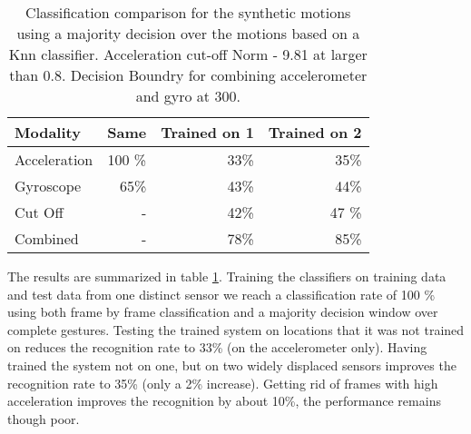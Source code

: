 \begin{table}
\centering 
\caption[Classification comparison]{\label{tab:synthetic1} Classification comparison for the synthetic motions using a
majority decision over the motions based on a Knn classifier. Acceleration cut-off Norm - 9.81 at larger than 0.8. Decision Boundry for combining accelerometer and gyro at 300. }
\begin{tabularx}{\textwidth}{Xrrr}\toprule
Modality& Same & Trained on 1& Trained on 2\\\midrule Acceleration&
100 \%& 33\%& 35\%\\ Gyroscope& 65\% & 43\%& 44\%\\ Cut Off& -& 42\%&
47 \%\\ Combined & -& 78\%& 85\%\\ \bottomrule
\end{tabularx}%
\end{table}
\begin{table}
\centering
\caption[Confusion matrix, accelerometer and gyro combined]{Combined Accelerometer and Gyro trained on 2 evaluated on 4 Sensors Accuracy 85 \%, Decision Boundary at 300.}
\label{tab:conf_synth}
\vspace{-10pt}
\end{table}
The results are summarized in table \ref{tab:synthetic1}.
Training the classifiers on training data and test data from
one distinct sensor we reach a classification rate of 
100 \% using both frame by frame classification and a majority decision window
over complete gestures.  Testing the trained system on locations that
it was not trained on reduces the recognition rate to 33\% (on the
accelerometer only). Having
trained the system not on one, but on two widely displaced sensors
improves the recognition rate to 35\% (only a 2\% increase). Getting rid of frames
with high acceleration improves the recognition by about 10\%, the
performance remains though poor.

